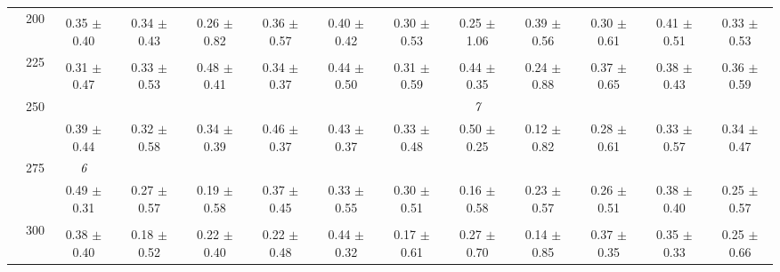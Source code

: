 \begin{table}[h]
{\begin{tabular}{
        ccccccccccccc}
 & \multirow{2}{*}{200}& & & & & & & & & & &  \\ 
 & & 0.35 $\pm$ 0.40& 0.34 $\pm$ 0.43& 0.26 $\pm$ 0.82& 0.36 $\pm$ 0.57& 0.40 $\pm$ 0.42& 0.30 $\pm$ 0.53& 0.25 $\pm$ 1.06& 0.39 $\pm$ 0.56& 0.30 $\pm$ 0.61& 0.41 $\pm$ 0.51& 0.33 $\pm$ 0.53 \\ 
 & \multirow{2}{*}{225}& \cellcolor[HTML]{EFEFEF} & \cellcolor[HTML]{EFEFEF} & \cellcolor[HTML]{EFEFEF} & \cellcolor[HTML]{EFEFEF} & \cellcolor[HTML]{EFEFEF} & \cellcolor[HTML]{EFEFEF} & \cellcolor[HTML]{EFEFEF} & \cellcolor[HTML]{EFEFEF} & \cellcolor[HTML]{EFEFEF} & \cellcolor[HTML]{EFEFEF} & \cellcolor[HTML]{EFEFEF}  \\ 
 & & \cellcolor[HTML]{EFEFEF} 0.31 $\pm$ 0.47& \cellcolor[HTML]{EFEFEF} 0.33 $\pm$ 0.53& \cellcolor[HTML]{EFEFEF} 0.48 $\pm$ 0.41& \cellcolor[HTML]{EFEFEF} 0.34 $\pm$ 0.37& \cellcolor[HTML]{EFEFEF} 0.44 $\pm$ 0.50& \cellcolor[HTML]{EFEFEF} 0.31 $\pm$ 0.59& \cellcolor[HTML]{EFEFEF} 0.44 $\pm$ 0.35& \cellcolor[HTML]{EFEFEF} 0.24 $\pm$ 0.88& \cellcolor[HTML]{EFEFEF} 0.37 $\pm$ 0.65& \cellcolor[HTML]{EFEFEF} 0.38 $\pm$ 0.43& \cellcolor[HTML]{EFEFEF} 0.36 $\pm$ 0.59 \\ 
 & \multirow{2}{*}{250}& & & & & & & \textit{ 7 }& & & &  \\ 
 & & 0.39 $\pm$ 0.44& 0.32 $\pm$ 0.58& 0.34 $\pm$ 0.39& 0.46 $\pm$ 0.37& 0.43 $\pm$ 0.37& 0.33 $\pm$ 0.48& 0.50 $\pm$ 0.25& 0.12 $\pm$ 0.82& 0.28 $\pm$ 0.61& 0.33 $\pm$ 0.57& 0.34 $\pm$ 0.47 \\ 
 & \multirow{2}{*}{275}& \cellcolor[HTML]{EFEFEF} \textit{ 6 }& \cellcolor[HTML]{EFEFEF} & \cellcolor[HTML]{EFEFEF} & \cellcolor[HTML]{EFEFEF} & \cellcolor[HTML]{EFEFEF} & \cellcolor[HTML]{EFEFEF} & \cellcolor[HTML]{EFEFEF} & \cellcolor[HTML]{EFEFEF} & \cellcolor[HTML]{EFEFEF} & \cellcolor[HTML]{EFEFEF} & \cellcolor[HTML]{EFEFEF}  \\ 
 & & \cellcolor[HTML]{EFEFEF} 0.49 $\pm$ 0.31& \cellcolor[HTML]{EFEFEF} 0.27 $\pm$ 0.57& \cellcolor[HTML]{EFEFEF} 0.19 $\pm$ 0.58& \cellcolor[HTML]{EFEFEF} 0.37 $\pm$ 0.45& \cellcolor[HTML]{EFEFEF} 0.33 $\pm$ 0.55& \cellcolor[HTML]{EFEFEF} 0.30 $\pm$ 0.51& \cellcolor[HTML]{EFEFEF} 0.16 $\pm$ 0.58& \cellcolor[HTML]{EFEFEF} 0.23 $\pm$ 0.57& \cellcolor[HTML]{EFEFEF} 0.26 $\pm$ 0.51& \cellcolor[HTML]{EFEFEF} 0.38 $\pm$ 0.40& \cellcolor[HTML]{EFEFEF} 0.25 $\pm$ 0.57 \\ 
 & \multirow{2}{*}{300}& & & & & & & & & & &  \\ 
 & & 0.38 $\pm$ 0.40& 0.18 $\pm$ 0.52& 0.22 $\pm$ 0.40& 0.22 $\pm$ 0.48& 0.44 $\pm$ 0.32& 0.17 $\pm$ 0.61& 0.27 $\pm$ 0.70& 0.14 $\pm$ 0.85& 0.37 $\pm$ 0.35& 0.35 $\pm$ 0.33& 0.25 $\pm$ 0.66 \\ 

\end{tabular}}
\end{table}
